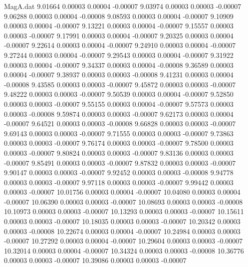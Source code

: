 \begin{filecontents}{MagA.dat}
   9.01664    0.00003    0.00004   -0.00007
   9.03974    0.00003    0.00003   -0.00007
   9.06288    0.00003    0.00004   -0.00008
   9.08593    0.00003    0.00004   -0.00007
   9.10909    0.00003    0.00004   -0.00007
   9.13221    0.00003    0.00004   -0.00007
   9.15557    0.00003    0.00003   -0.00007
   9.17991    0.00003    0.00004   -0.00007
   9.20325    0.00003    0.00004   -0.00007
   9.22614    0.00003    0.00004   -0.00007
   9.24910    0.00003    0.00004   -0.00007
   9.27244    0.00003    0.00004   -0.00007
   9.29543    0.00003    0.00004   -0.00007
   9.31922    0.00003    0.00004   -0.00007
   9.34337    0.00003    0.00004   -0.00008
   9.36589    0.00003    0.00004   -0.00007
   9.38937    0.00003    0.00003   -0.00008
   9.41231    0.00003    0.00004   -0.00008
   9.43585    0.00003    0.00003   -0.00007
   9.45872    0.00003    0.00003   -0.00007
   9.48222    0.00003    0.00003   -0.00007
   9.50539    0.00003    0.00004   -0.00007
   9.52850    0.00003    0.00003   -0.00007
   9.55155    0.00003    0.00004   -0.00007
   9.57573    0.00003    0.00003   -0.00008
   9.59874    0.00003    0.00003   -0.00007
   9.62173    0.00003    0.00004   -0.00007
   9.64521    0.00003    0.00003   -0.00008
   9.66828    0.00003    0.00003   -0.00007
   9.69143    0.00003    0.00003   -0.00007
   9.71555    0.00003    0.00003   -0.00007
   9.73863    0.00003    0.00003   -0.00007
   9.76174    0.00003    0.00003   -0.00007
   9.78500    0.00003    0.00003   -0.00007
   9.80824    0.00003    0.00003   -0.00007
   9.83136    0.00003    0.00003   -0.00007
   9.85491    0.00003    0.00003   -0.00007
   9.87832    0.00003    0.00003   -0.00007
   9.90147    0.00003    0.00003   -0.00007
   9.92452    0.00003    0.00003   -0.00008
   9.94778    0.00003    0.00003   -0.00007
   9.97118    0.00003    0.00003   -0.00007
   9.99442    0.00003    0.00003   -0.00007
  10.01756    0.00003    0.00004   -0.00007
  10.04080    0.00003    0.00004   -0.00007
  10.06390    0.00003    0.00003   -0.00007
  10.08693    0.00003    0.00003   -0.00008
  10.10973    0.00003    0.00003   -0.00007
  10.13293    0.00003    0.00003   -0.00007
  10.15611    0.00003    0.00003   -0.00007
  10.18035    0.00003    0.00003   -0.00007
  10.20342    0.00003    0.00003   -0.00008
  10.22674    0.00003    0.00004   -0.00007
  10.24984    0.00003    0.00003   -0.00007
  10.27292    0.00003    0.00004   -0.00007
  10.29604    0.00003    0.00003   -0.00007
  10.32014    0.00003    0.00004   -0.00007
  10.34324    0.00003    0.00003   -0.00008
  10.36776    0.00003    0.00003   -0.00007
  10.39086    0.00003    0.00003   -0.00007

\end{filecontents}
